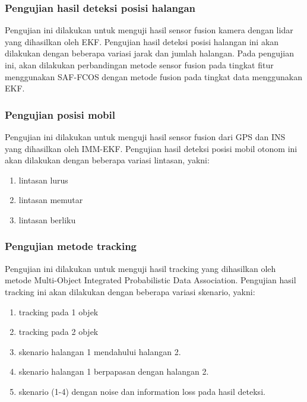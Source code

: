 \begin{frame}
    \frametitle{Pengujian hasil deteksi posisi halangan}
    \justifying
    Pengujian ini dilakukan untuk menguji hasil sensor fusion kamera dengan lidar yang dihasilkan oleh EKF. Pengujian hasil deteksi posisi halangan ini akan dilakukan dengan beberapa variasi jarak dan jumlah halangan. Pada pengujian ini, akan dilakukan perbandingan metode sensor fusion pada tingkat fitur menggunakan SAF-FCOS dengan metode fusion pada tingkat data menggunakan EKF.
\end{frame}


\begin{frame}
    \frametitle{Pengujian posisi mobil}
    \justifying
    Pengujian ini dilakukan untuk menguji hasil sensor fusion dari GPS dan INS yang dihasilkan oleh IMM-EKF. Pengujian hasil deteksi posisi mobil otonom ini akan dilakukan dengan beberapa variasi lintasan, yakni:
    \begin{enumerate}
        \item lintasan lurus
        \item lintasan memutar
        \item lintasan berliku
    \end{enumerate}
\end{frame}


\begin{frame}
    \frametitle{Pengujian metode tracking}
    \justifying
    Pengujian ini dilakukan untuk menguji hasil tracking yang dihasilkan oleh metode Multi-Object Integrated Probabilistic Data Association. Pengujian hasil tracking ini akan dilakukan dengan beberapa variasi skenario, yakni:
            \begin{enumerate}
                \item tracking pada 1 objek
                \item tracking pada 2 objek
                \item skenario halangan 1 mendahului halangan 2.
                \item skenario halangan 1 berpapasan dengan halangan 2.
                \item skenario (1-4) dengan noise dan information loss pada hasil deteksi.
            \end{enumerate}
\end{frame}